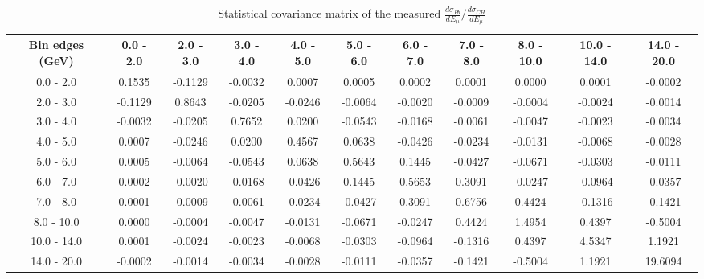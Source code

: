 \documentclass[aps,prl,twocolumn,superscriptaddress,nofootinbib]{revtex4-1}
\begin{document}
\begin{turnpage}
 \begin{table}[h!]
  \centering
  \caption{Statistical covariance matrix of the measured $\frac{d\sigma_{Pb}}{dE_{\mu}}/\frac{d\sigma_{CH}}{dE_{\mu}}$}
    \begin{tabular}{c||cccccccccc}
      Bin edges (GeV) & 0.0 - 2.0 & 2.0 - 3.0 & 3.0 - 4.0 & 4.0 - 5.0 & 5.0 - 6.0 & 6.0 - 7.0 & 7.0 - 8.0 & 8.0 - 10.0 & 10.0 - 14.0 & 14.0 - 20.0 \\
\hline \hline
        0.0 - 2.0 &  0.1535 & -0.1129 & -0.0032 &  0.0007 &  0.0005 &  0.0002 &  0.0001 &  0.0000 &  0.0001 & -0.0002 \\
        2.0 - 3.0 & -0.1129 &  0.8643 & -0.0205 & -0.0246 & -0.0064 & -0.0020 & -0.0009 & -0.0004 & -0.0024 & -0.0014 \\
        3.0 - 4.0 & -0.0032 & -0.0205 &  0.7652 &  0.0200 & -0.0543 & -0.0168 & -0.0061 & -0.0047 & -0.0023 & -0.0034 \\
        4.0 - 5.0 &  0.0007 & -0.0246 &  0.0200 &  0.4567 &  0.0638 & -0.0426 & -0.0234 & -0.0131 & -0.0068 & -0.0028 \\
        5.0 - 6.0 &  0.0005 & -0.0064 & -0.0543 &  0.0638 &  0.5643 &  0.1445 & -0.0427 & -0.0671 & -0.0303 & -0.0111 \\
        6.0 - 7.0 &  0.0002 & -0.0020 & -0.0168 & -0.0426 &  0.1445 &  0.5653 &  0.3091 & -0.0247 & -0.0964 & -0.0357 \\
        7.0 - 8.0 &  0.0001 & -0.0009 & -0.0061 & -0.0234 & -0.0427 &  0.3091 &  0.6756 &  0.4424 & -0.1316 & -0.1421 \\
       8.0 - 10.0 &  0.0000 & -0.0004 & -0.0047 & -0.0131 & -0.0671 & -0.0247 &  0.4424 &  1.4954 &  0.4397 & -0.5004 \\
      10.0 - 14.0 &  0.0001 & -0.0024 & -0.0023 & -0.0068 & -0.0303 & -0.0964 & -0.1316 &  0.4397 &  4.5347 &  1.1921 \\
      14.0 - 20.0 & -0.0002 & -0.0014 & -0.0034 & -0.0028 & -0.0111 & -0.0357 & -0.1421 & -0.5004 &  1.1921 & 19.6094 \\
    \end{tabular}
  \label{tablecov:Pb_Statistical_Emu}
  \end{table}
\end{turnpage}
\end{document}
